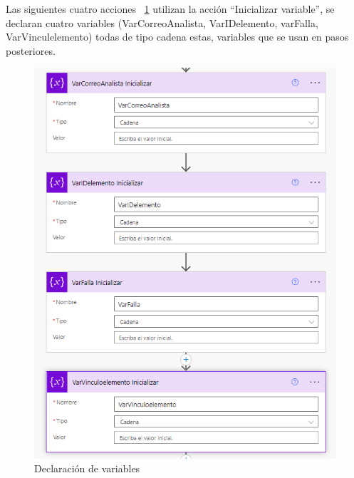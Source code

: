 Las siguientes cuatro acciones ~\ref{fig:DeclVar} utilizan la acción ``Inicializar variable'', se declaran cuatro variables (VarCorreoAnalista, VarIDelemento, varFalla, VarVinculelemento) todas de tipo cadena estas, variables  que se usan en pasos posteriores.
\begin{figure}[H]
	\centering
	\includegraphics[scale=0.5]{Capitulo3/imagenes/flujo2.png}
	\caption{Declaración de variables}
	\label{fig:DeclVar}
\end{figure}

